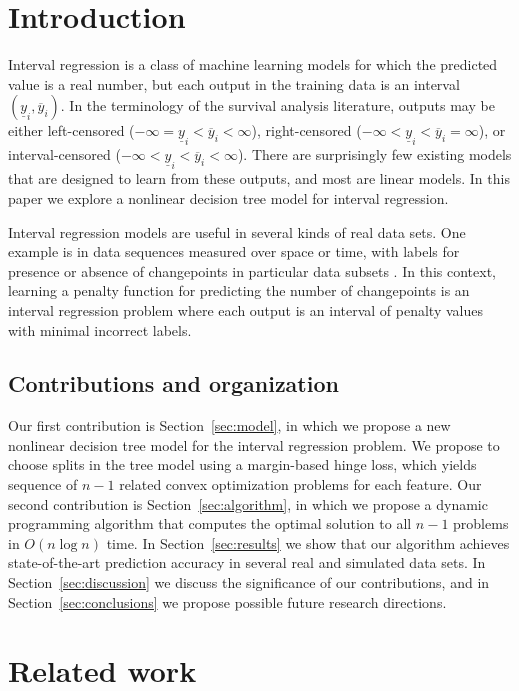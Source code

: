 \documentclass{article}
\begin{document}
\section{Introduction}
Interval regression is a class of machine learning models for which
the predicted value is a real number, but each output in the training
data is an interval $(\underline y_i, \overline y_i)$.  In the
terminology of the survival analysis literature, outputs may be either
left-censored ($-\infty=\underline y_i<\overline y_i<\infty$),
right-censored ($-\infty<\underline y_i<\overline y_i=\infty$), or
interval-censored ($-\infty<\underline y_i<\overline y_i<\infty$).
There are surprisingly few existing models that are designed to learn
from these outputs, and most are linear models. In this paper we
explore a nonlinear decision tree model for interval regression.


Interval regression models are useful in several
kinds of real data sets. One example is in data sequences measured
over space or time, with labels for presence or absence of
changepoints in particular data subsets \citep{HOCKING-penalties}. In
this context, learning a penalty function for predicting the number of
changepoints is an interval regression problem where each output is an
interval of penalty values with minimal incorrect labels.

\subsection{Contributions and organization}

Our first contribution is Section~\ref{sec:model}, in which we propose
a new nonlinear decision tree model for the interval regression
problem. We propose to choose splits in the tree model using a
margin-based hinge loss, which yields sequence of $n-1$ related convex
optimization problems for each feature. Our second contribution is
Section~\ref{sec:algorithm}, in which we propose a dynamic programming
algorithm that computes the optimal solution to all $n-1$ problems in
$O(n\log n)$ time. In Section~\ref{sec:results} we show that our
algorithm achieves state-of-the-art prediction accuracy in several
real and simulated data sets. In Section~\ref{sec:discussion} we
discuss the significance of our contributions, and in
Section~\ref{sec:conclusions} we propose possible future research
directions.

\section{Related work}
\end{document}
